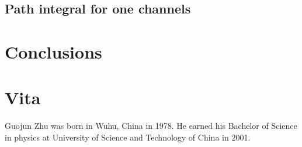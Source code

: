 \documentclass[edeposit,fullpage]{uiucthesis2009}
\begin{document}
\mainmatter

\section{Path integral for one channels}




\chapter{Conclusions}


\appendix

%



\backmatter



\chapter{Vita}

Guojun  Zhu was born in Wuhu, China in 1978.  He earned his Bachelor of Science in physics at University of Science and Technology of China in 2001.  
\end{document}
